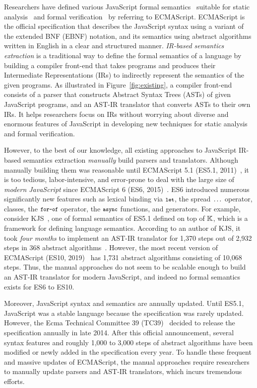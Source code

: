 Researchers have defined various JavaScript formal
semantics~\cite{aplas08,lambdajs,kjs,javert} suitable for static
analysis~\cite{jsai,tajs,wala,safe} and formal verification~\cite{javert} by
referring to ECMAScript.  ECMAScript is the official specification that
describes the JavaScript syntax using a variant of the extended BNF (EBNF) notation,
and its semantics using abstract algorithms written in English in a clear and
structured manner.  \textit{IR-based semantics extraction} is a traditional way to
define the formal semantics of a language by building a compiler front-end
that takes programs and produces their Intermediate
Representations (IRs) to indirectly represent the semantics of the given programs.
As illustrated in Figure~\ref{fig:existing}, a compiler front-end consists of a parser
that constructs Abstract Syntax Trees (ASTs) of given JavaScript programs, and
an AST-IR translator that converts ASTs to their own IRs.  It helps
researchers focus on IRs without worrying about diverse and enormous features of
JavaScript in developing new techniques for static analysis and formal
verification.

However, to the best of our knowledge, all existing approaches to JavaScript
IR-based semantics extraction \textit{manually} build parsers and translators.
Although manually building them was reasonable until ECMAScript 5.1 (ES5.1,
2011)~\cite{es5}, it is too tedious, labor-intensive, and
error-prone to deal with the large size of \textit{modern JavaScript} since ECMAScript 6
(ES6, 2015)~\cite{es6}. ES6 introduced numerous significantly new features such
as lexical binding via \( \texttt{\footnotesize let} \), the spread \( \texttt{\footnotesize...} \) operator,
classes, the \( \texttt{\footnotesize for-of} \) operator, the \( \texttt{\footnotesize async} \) functions, and
generators.  For example, consider KJS~\cite{kjs},
one of formal semantics of ES5.1 defined on top of \( \mathbb{K} \), which is
a framework for defining language semantics.
According to an author of KJS, it took
\textit{four months} to implement an AST-IR translator for 1,370 steps out of 2,932
steps in 368 abstract algorithms~\cite{kjsslides}. However, the most recent version of ECMAScript
(ES10, 2019)~\cite{es10} has 1,731 abstract algorithms consisting of 10,068
steps. Thus, the manual approaches do not seem to be scalable enough to build
an AST-IR translator for modern JavaScript,
and indeed no formal semantics exists for ES6 to ES10.

Moreover, JavaScript syntax and semantics are annually updated.  Until
ES5.1, JavaScript was a stable language because the specification was
rarely updated.  However, the Ecma Technical Committee 39 (TC39)~\cite{tc39}
decided to release the specification annually in late 2014.  After this official
announcement, several syntax features and roughly 1,000 to 3,000 steps of
abstract algorithms have been modified or newly added in the specification every year.
To handle these frequent and massive updates of ECMAScript,
the manual approaches require researchers to manually update parsers and AST-IR translators,
which incurs tremendous efforts.

